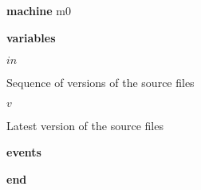 \begin{block}
  \item   \textbf{machine} m0
  \item   \textbf{variables}
  \begin{block}
    \item   $in$
    \item   \begin{block}
      \item   Sequence of versions of the source files
    \end{block}
    \item   $v$
    \item   \begin{block}
      \item   Latest version of the source files
    \end{block}
  \end{block}
  \item   
  \item   
  \item   \textbf{events}
  \begin{block}
    \item   
  \end{block}
  \item   \textbf{end} \\
\end{block}
